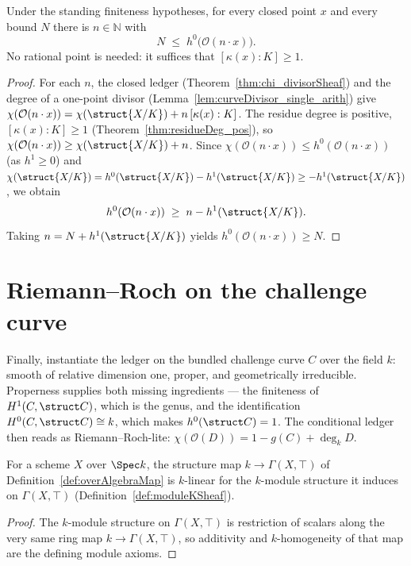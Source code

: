 \begin{theorem}
  \label{thm:h0_nsmul_point_unbounded}
  \leanok
  Under the standing finiteness hypotheses, for every closed point \(x\) and every bound \(N\)
  there is \(n \in \mathbb N\) with
  \[
    N \;\le\; h^0\bigl(\mathcal O(n \cdot x)\bigr).
  \]
  No rational point is needed: it suffices that \([\kappa(x):K] \ge 1\).
\end{theorem}
\begin{proof}
  \leanok
  For each \(n\), the closed ledger (Theorem~\ref{thm:chi_divisorSheaf}) and the degree of a
  one-point divisor (Lemma~\ref{lem:curveDivisor_single_arith}) give
  \(\chi(\mathcal O(n\cdot x)) = \chi(\struct{X/K}) + n\,[\kappa(x):K]\). The residue degree is
  positive, \([\kappa(x):K] \ge 1\) (Theorem~\ref{thm:residueDeg_pos}), so
  \(\chi(\mathcal O(n\cdot x)) \ge \chi(\struct{X/K}) + n\). Since
  \(\chi(\mathcal O(n\cdot x)) \le h^0(\mathcal O(n\cdot x))\) (as \(h^1 \ge 0\)) and
  \(\chi(\struct{X/K}) = h^0(\struct{X/K}) - h^1(\struct{X/K}) \ge -h^1(\struct{X/K})\), we obtain
  \[
    h^0(\mathcal O(n\cdot x)) \;\ge\; n - h^1(\struct{X/K}).
  \]
  Taking \(n = N + h^1(\struct{X/K})\) yields \(h^0(\mathcal O(n\cdot x)) \ge N\).
\end{proof}

\section{Riemann--Roch on the challenge curve}

Finally, instantiate the ledger on the bundled challenge curve \(C\) over the field \(k\): smooth
of relative dimension one, proper, and geometrically irreducible. Properness supplies both
missing ingredients --- the finiteness of \(H^1(C, \struct C)\), which is the genus, and the
identification \(H^0(C, \struct C) \cong k\), which makes \(h^0(\struct C) = 1\). The conditional
ledger then reads as Riemann--Roch-lite: \(\chi(\mathcal O(D)) = 1 - g(C) + \deg_k D\).

\begin{definition}
  \label{def:overAlgebraMapTopLinear}
  \leanok
  For a scheme \(X\) over \(\Spec k\), the structure map \(k \to \Gamma(X, \top)\) of
  Definition~\ref{def:overAlgebraMap} is \(k\)-linear for the \(k\)-module structure it induces
  on \(\Gamma(X, \top)\) (Definition~\ref{def:moduleKSheaf}).
\end{definition}
\begin{proof}
  \leanok
  The \(k\)-module structure on \(\Gamma(X, \top)\) is restriction of scalars along the very same
  ring map \(k \to \Gamma(X, \top)\), so additivity and \(k\)-homogeneity of that map are the
  defining module axioms.
\end{proof}

